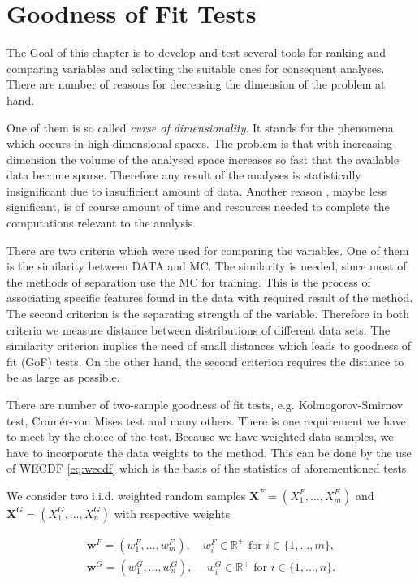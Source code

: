 \chapter{Goodness of Fit Tests}
\label{ch:GoF}

\noindent The Goal of this chapter is to develop and test several tools for ranking and comparing variables and selecting the suitable ones for consequent analyses. There are number of reasons for decreasing the dimension of the problem at hand. 

One of them is so called {\em curse of dimensionality}. It stands for the phenomena which occurs in high-dimensional spaces. The problem is that with increasing dimension the volume of the analysed space increases so fast that the available data become sparse. Therefore any result of the analyses is statistically insignificant due to insufficient amount of data. Another reason , maybe less significant, is of course amount of time and resources needed to complete the computations relevant to the analysis. 

There are two criteria which were used for comparing the variables. One of them is the similarity between DATA and MC. The similarity is needed, since most of the methods of separation use the MC for training. This is the process of associating specific features found in the data with required result of the method. The second criterion is the separating strength of the variable. Therefore in both criteria we measure distance between distributions of different data sets. The similarity criterion implies the need of small distances which leads to goodness of fit (GoF)  tests. On the other hand, the second criterion requires the distance to be as large as possible. 

There are number of two-sample goodness of fit  tests, e.g. Kolmogorov-Smirnov test, Cram\'{e}r-von Mises test and many others. There is one requirement we have to meet by the choice of the test. Because we have weighted data samples, we have to incorporate the data weights to the method. This can be done by the use of WECDF  \eqref{eq:wecdf} which is the basis of the statistics of aforementioned tests. 

We consider two i.i.d. weighted random samples $\mathbf{X}^F = (X^F_1,\ldots, X^F_m)$ and $\mathbf{X}^G = (X^G_1, \ldots, X^G_n)$ with respective weights 

\begin{align*}
\mathbf{w}^F = (w^F_1,\ldots, w^F_m), \quad w_i^F \in \mathbb{R}^+ \text{ for }  i \in \lbrace 1, \ldots, m \rbrace, \\
\mathbf{w}^G = (w^G_1,\ldots, w^G_n), \:
\quad w_i^G \in \mathbb{R}^+ \text{ for } i \in \lbrace 1, \ldots, n \rbrace. 
\end{align*}

